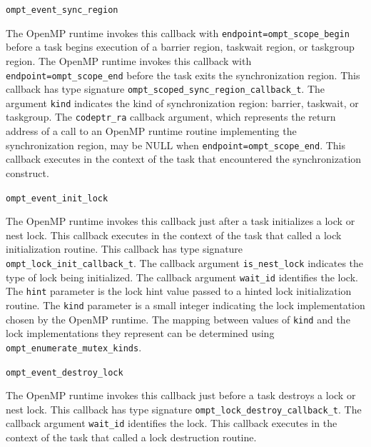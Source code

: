 \documentclass{article}
\newcommand{\descheader}[1]{{\needspace{3\baselineskip}\vspace{1em}\noindent \fbox{#1}}}
\begin{document}
\begin{description}

\item \lstinline|ompt_event_sync_region|

 \sloppy
  The OpenMP runtime invokes this callback with \lstinline|endpoint=|\lstinline|ompt_scope_begin| before a task
  begins execution of a barrier region, taskwait region, or taskgroup region. 
   The OpenMP runtime invokes this callback with \lstinline|endpoint=|\lstinline|ompt_scope_end| before the task exits the synchronization region. 
 This callback has type signature \lstinline|ompt_scoped_sync_region_callback_t|. 
  The argument \lstinline|kind| indicates the kind of synchronization region: barrier, taskwait, or taskgroup.
  The \lstinline|codeptr_ra| callback argument, which represents the return address of a call to an OpenMP runtime routine implementing the synchronization region,
  may be NULL when \lstinline|endpoint=|\lstinline|ompt_scope_end|.
  This callback executes in the context of the task that encountered the synchronization construct.

\end{description}

\descheader{Lock Creation and Destruction}

\begin{description}

\item \lstinline|ompt_event_init_lock|

   The OpenMP runtime invokes this callback just after a
   task initializes a lock or nest lock.  This callback executes in the
   context of the task that called a lock initialization routine.
   This callback has type signature \lstinline|ompt_lock_init_callback_t|. 
   The callback argument \lstinline|is_nest_lock| indicates the type of lock being initialized.
   The callback argument \lstinline|wait_id| identifies the lock. 
   The \lstinline|hint| parameter is the lock hint value passed to a hinted lock initialization routine.
   The \lstinline|kind| parameter is a small integer indicating the lock implementation chosen by the OpenMP runtime. 
   The mapping between values of \lstinline|kind| and the lock implementations they represent can be determined using 
   \lstinline|ompt_enumerate_mutex_kinds|. 

\item \lstinline|ompt_event_destroy_lock|

   The OpenMP runtime invokes this callback just before a
   task destroys a lock or nest lock.  
   This callback has type signature \lstinline|ompt_lock_destroy_callback_t|. 
   The callback argument \lstinline|wait_id| identifies the lock. 
   This callback executes in the context of the task that called a lock destruction routine.

\end{description}
\end{document}
